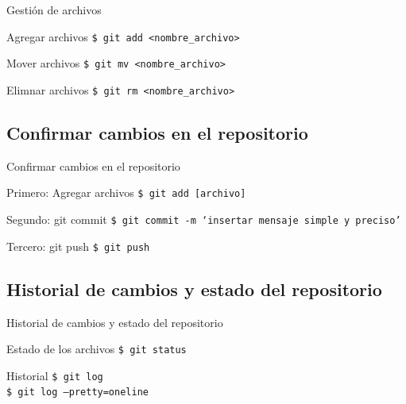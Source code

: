 \documentclass{beamer}
\begin{document}
\begin{frame} {Gestión de archivos}

  \begin{block}{Agregar archivos }
    {\texttt{\$ git add <nombre\_archivo> }}
  \end{block}

  \begin{block}{Mover archivos}
    \texttt{\$ git mv <nombre\_archivo>}
  \end{block}

  \begin{block}{Elimnar archivos}
    \texttt{\$ git rm <nombre\_archivo>}
  \end{block}

\end{frame}


\subsection {Confirmar cambios en el repositorio}

  \begin{frame} {Confirmar cambios en el repositorio}

    \begin{block}{Primero: Agregar archivos }
      {\texttt{\$ git add [archivo] }}
    \end{block}

    \begin{block}{Segundo: git commit}
      {\texttt{\$ git commit -m `insertar mensaje simple y preciso' }}
    \end{block}

    \begin{block}{Tercero: git push}
      {\texttt{\$ git push}}
    \end{block}

  \end{frame}


  \subsection {Historial de cambios y estado del repositorio}

  \begin{frame} {\LARGE Historial de cambios y estado del repositorio}
    
    \begin{block}{Estado de los archivos}
      {\texttt{\$ git status}} 
    \end{block}

    \begin{block}{Historial}
      {\texttt{\$ git log}} \\
      \texttt{\$ git log --pretty=oneline} 
    \end{block}


  \end{frame}
\end{document}
